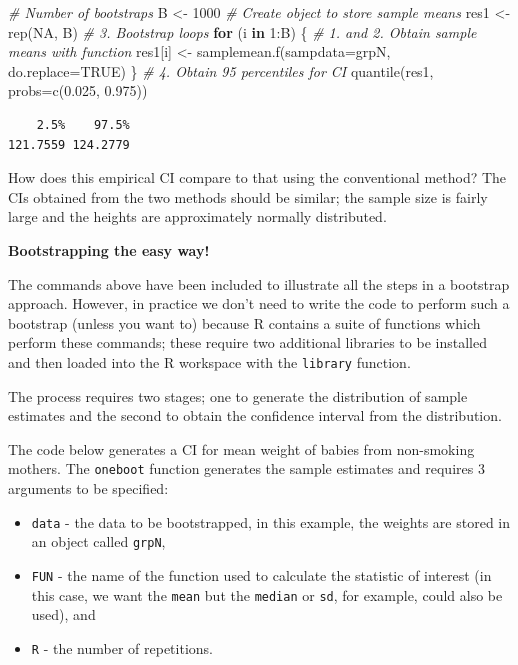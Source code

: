 \documentclass[
  oneside]{krantz}
\newenvironment{Shaded}{\begin{snugshade}}{\end{snugshade}}
\newcommand{\AttributeTok}[1]{\textcolor[rgb]{0.77,0.63,0.00}{#1}}
\newcommand{\CommentTok}[1]{\textcolor[rgb]{0.56,0.35,0.01}{\textit{#1}}}
\newcommand{\ConstantTok}[1]{\textcolor[rgb]{0.00,0.00,0.00}{#1}}
\newcommand{\ControlFlowTok}[1]{\textcolor[rgb]{0.13,0.29,0.53}{\textbf{#1}}}
\newcommand{\DecValTok}[1]{\textcolor[rgb]{0.00,0.00,0.81}{#1}}
\newcommand{\FloatTok}[1]{\textcolor[rgb]{0.00,0.00,0.81}{#1}}
\newcommand{\FunctionTok}[1]{\textcolor[rgb]{0.00,0.00,0.00}{#1}}
\newcommand{\NormalTok}[1]{#1}
\newcommand{\OtherTok}[1]{\textcolor[rgb]{0.56,0.35,0.01}{#1}}
\newcommand{\SpecialCharTok}[1]{\textcolor[rgb]{0.00,0.00,0.00}{#1}}
\providecommand{\tightlist}{%
  \setlength{\itemsep}{0pt}\setlength{\parskip}{0pt}}
\begin{document}
\begin{Shaded}
\begin{Highlighting}[]
\CommentTok{\# Number of bootstraps}
\NormalTok{B }\OtherTok{\textless{}{-}} \DecValTok{1000}
\CommentTok{\# Create object to store sample means}
\NormalTok{res1 }\OtherTok{\textless{}{-}} \FunctionTok{rep}\NormalTok{(}\ConstantTok{NA}\NormalTok{, B)}
\CommentTok{\# 3. Bootstrap loops}
\ControlFlowTok{for}\NormalTok{ (i }\ControlFlowTok{in} \DecValTok{1}\SpecialCharTok{:}\NormalTok{B) \{}
  \CommentTok{\# 1. and 2. Obtain sample means with function}
\NormalTok{  res1[i] }\OtherTok{\textless{}{-}} \FunctionTok{samplemean.f}\NormalTok{(}\AttributeTok{sampdata=}\NormalTok{grpN, }\AttributeTok{do.replace=}\ConstantTok{TRUE}\NormalTok{)}
\NormalTok{\}}
\CommentTok{\# 4. Obtain 95 percentiles for CI}
\FunctionTok{quantile}\NormalTok{(res1, }\AttributeTok{probs=}\FunctionTok{c}\NormalTok{(}\FloatTok{0.025}\NormalTok{, }\FloatTok{0.975}\NormalTok{))}
\end{Highlighting}
\end{Shaded}

\begin{verbatim}
    2.5%    97.5% 
121.7559 124.2779 
\end{verbatim}

How does this empirical CI compare to that using the conventional method? The CIs obtained from the two methods should be similar; the sample size is fairly large and the heights are approximately normally distributed.

\textbf{Bootstrapping the easy way!}

The commands above have been included to illustrate all the steps in a bootstrap approach. However, in practice we don't need to write the code to perform such a bootstrap (unless you want to) because R contains a suite of functions which perform these commands; these require two additional libraries to be installed and then loaded into the R workspace with the \texttt{library} function.

The process requires two stages; one to generate the distribution of sample estimates and the second to obtain the confidence interval from the distribution.

The code below generates a CI for mean weight of babies from non-smoking mothers. The \texttt{oneboot} function generates the sample estimates and requires 3 arguments to be specified:

\begin{itemize}
\tightlist
\item
  \texttt{data} - the data to be bootstrapped, in this example, the weights are stored in an object called \texttt{grpN},
\item
  \texttt{FUN} - the name of the function used to calculate the statistic of interest (in this case, we want the \texttt{mean} but the \texttt{median} or \texttt{sd}, for example, could also be used), and
\item
  \texttt{R} - the number of repetitions.
\end{itemize}
\end{document}
